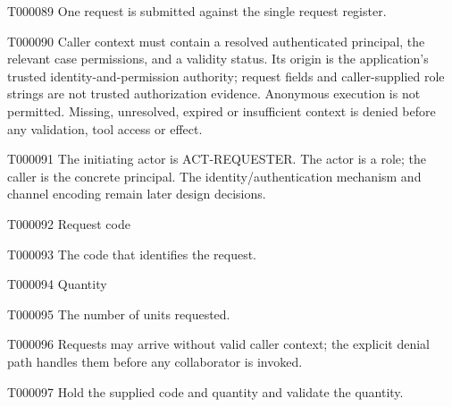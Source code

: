 \documentclass[11pt,a4paper]{article}
\begin{document}
\begin{atlasparagraph}{T000089}
One request is submitted against the single request register.
\end{atlasparagraph}
\begin{atlasparagraph}{T000090}
Caller context must contain a resolved authenticated principal, the relevant case permissions, and a validity status. Its origin is the application's trusted identity-and-permission authority; request fields and caller-supplied role strings are not trusted authorization evidence. Anonymous execution is not permitted. Missing, unresolved, expired or insufficient context is denied before any validation, tool access or effect.
\end{atlasparagraph}
\begin{atlasparagraph}{T000091}
The initiating actor is ACT-REQUESTER. The actor is a role; the caller is the concrete principal. The identity/authentication mechanism and channel encoding remain later design decisions.
\end{atlasparagraph}
\begin{atlastext}{T000092}
Request code
\end{atlastext}
\begin{atlasparagraph}{T000093}
The code that identifies the request.
\end{atlasparagraph}
\begin{atlastext}{T000094}
Quantity
\end{atlastext}
\begin{atlasparagraph}{T000095}
The number of units requested.
\end{atlasparagraph}
\begin{atlasparagraph}{T000096}
Requests may arrive without valid caller context; the explicit denial path handles them before any collaborator is invoked.
\end{atlasparagraph}
\begin{atlasparagraph}{T000097}
Hold the supplied code and quantity and validate the quantity.
\end{atlasparagraph}
\end{document}
